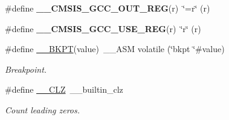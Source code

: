 \begin{DoxyCompactItemize}
\#define {\bfseries \+\_\+\+\_\+\+C\+M\+S\+I\+S\+\_\+\+G\+C\+C\+\_\+\+O\+U\+T\+\_\+\+R\+EG}(r)~\char`\"{}=r\char`\"{} (r)
\item 
\mbox{\label{group___c_m_s_i_s___core___instruction_interface_ga9d94dee7402367961d2cf0accc00fd97}} 
\#define {\bfseries \+\_\+\+\_\+\+C\+M\+S\+I\+S\+\_\+\+G\+C\+C\+\_\+\+U\+S\+E\+\_\+\+R\+EG}(r)~\char`\"{}r\char`\"{} (r)
\item 
\#define \hyperlink{group___c_m_s_i_s___core___instruction_interface_ga15ea6bd3c507d3e81c3b3a1258e46397}{\+\_\+\+\_\+\+B\+K\+PT}(value)~\+\_\+\+\_\+\+A\+SM volatile (\char`\"{}bkpt \char`\"{}\#value)
\begin{DoxyCompactList}\small\item\em Breakpoint. \end{DoxyCompactList}\item 
\#define \hyperlink{group___c_m_s_i_s___core___instruction_interface_ga5d5bb1527e042be4a9fa5a33f65cc248}{\+\_\+\+\_\+\+C\+LZ}~\+\_\+\+\_\+builtin\+\_\+clz
\begin{DoxyCompactList}\small\item\em Count leading zeros. \end{DoxyCompactList}\end{DoxyCompactItemize}
